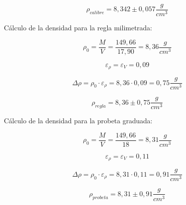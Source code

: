 \begin{equation}
    \boxed{\rho_{calibre} = 8{,}342 \pm 0{,}057 \frac{g}{cm^3}}
    \label{eq:densidad-resolucion-final-calibre}
\end{equation}

Cálculo de la densidad para la regla milimetrada:

\begin{equation}
    \rho_0 = \frac{M}{V} = \frac{149{,}66}{17{,}90} = 8{,}36 \frac{g}{cm^3}
    \label{eq:densidad-resolucion-regla}
\end{equation}

\begin{equation}
    \varepsilon_\rho = \varepsilon_V = 0{,}09
    \label{eq:incerteza-relativa-densidad-regla}
\end{equation}

\begin{equation}
    \Delta \rho = \rho_0 \cdot \varepsilon_\rho = 8{,}36 \cdot 0{,}09 = 0{,}75 \frac{g}{cm^3}
    \label{eq:incerteza-absoluta-densidad-resolucion-regla}
\end{equation}

\begin{equation}
    \boxed{\rho_{regla} = 8{,}36 \pm 0{,}75 \frac{g}{cm^3}}
    \label{eq:densidad-resolucion-final-regla}
\end{equation}

Cálculo de la densidad para la probeta graduada:

\begin{equation}
    \rho_0 = \frac{M}{V} = \frac{149{,}66}{18} = 8{,}31 \frac{g}{cm^3}
    \label{eq:densidad-resolucion-probeta}
\end{equation}

\begin{equation}
    \varepsilon_\rho = \varepsilon_V = 0{,}11
    \label{eq:incerteza-relativa-densidad-probeta}
\end{equation}

\begin{equation}
    \Delta \rho = \rho_0 \cdot \varepsilon_\rho = 8{,}31 \cdot 0{,}11 = 0{,}91 \frac{g}{cm^3}
    \label{eq:incerteza-absoluta-densidad-resolucion-probeta}
\end{equation}

\begin{equation}
    \boxed{\rho_{probeta} = 8{,}31 \pm 0{,}91 \frac{g}{cm^3}}
    \label{eq:densidad-resolucion-final-probeta}
\end{equation}

